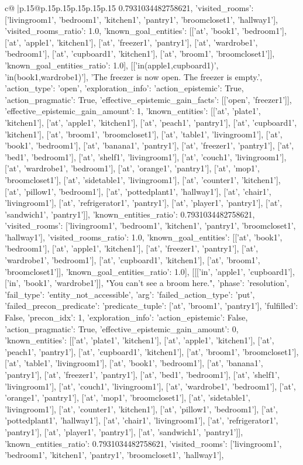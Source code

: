 \documentclass{article}
\begin{document}
{\begin{supertabular}{c@{$\;$}|p{.15\linewidth}@{}p{.15\linewidth}p{.15\linewidth}p{.15\linewidth}p{.15\linewidth}p{.15\linewidth}}
{{{0.7931034482758621, 'visited_rooms': ['livingroom1', 'bedroom1', 'kitchen1', 'pantry1', 'broomcloset1', 'hallway1'], 'visited_rooms_ratio': 1.0, 'known_goal_entities': [['at', 'book1', 'bedroom1'], ['at', 'apple1', 'kitchen1'], ['at', 'freezer1', 'pantry1'], ['at', 'wardrobe1', 'bedroom1'], ['at', 'cupboard1', 'kitchen1'], ['at', 'broom1', 'broomcloset1']], 'known_goal_entities_ratio': 1.0}}], [['in(apple1,cupboard1)', 'in(book1,wardrobe1)'], 'The freezer is now open. The freezer is empty.', {'action_type': 'open', 'exploration_info': {'action_epistemic': True, 'action_pragmatic': True, 'effective_epistemic_gain_facts': [['open', 'freezer1']], 'effective_epistemic_gain_amount': 1, 'known_entities': [['at', 'plate1', 'kitchen1'], ['at', 'apple1', 'kitchen1'], ['at', 'peach1', 'pantry1'], ['at', 'cupboard1', 'kitchen1'], ['at', 'broom1', 'broomcloset1'], ['at', 'table1', 'livingroom1'], ['at', 'book1', 'bedroom1'], ['at', 'banana1', 'pantry1'], ['at', 'freezer1', 'pantry1'], ['at', 'bed1', 'bedroom1'], ['at', 'shelf1', 'livingroom1'], ['at', 'couch1', 'livingroom1'], ['at', 'wardrobe1', 'bedroom1'], ['at', 'orange1', 'pantry1'], ['at', 'mop1', 'broomcloset1'], ['at', 'sidetable1', 'livingroom1'], ['at', 'counter1', 'kitchen1'], ['at', 'pillow1', 'bedroom1'], ['at', 'pottedplant1', 'hallway1'], ['at', 'chair1', 'livingroom1'], ['at', 'refrigerator1', 'pantry1'], ['at', 'player1', 'pantry1'], ['at', 'sandwich1', 'pantry1']], 'known_entities_ratio': 0.7931034482758621, 'visited_rooms': ['livingroom1', 'bedroom1', 'kitchen1', 'pantry1', 'broomcloset1', 'hallway1'], 'visited_rooms_ratio': 1.0, 'known_goal_entities': [['at', 'book1', 'bedroom1'], ['at', 'apple1', 'kitchen1'], ['at', 'freezer1', 'pantry1'], ['at', 'wardrobe1', 'bedroom1'], ['at', 'cupboard1', 'kitchen1'], ['at', 'broom1', 'broomcloset1']], 'known_goal_entities_ratio': 1.0}}], [[['in', 'apple1', 'cupboard1'], ['in', 'book1', 'wardrobe1']], "You can't see a broom here.", {'phase': 'resolution', 'fail_type': 'entity_not_accessible', 'arg': {'failed_action_type': 'put', 'failed_precon_predicate': {'predicate_tuple': ['at', 'broom1', 'pantry1'], 'fulfilled': False, 'precon_idx': 1}}, 'exploration_info': {'action_epistemic': False, 'action_pragmatic': True, 'effective_epistemic_gain_amount': 0, 'known_entities': [['at', 'plate1', 'kitchen1'], ['at', 'apple1', 'kitchen1'], ['at', 'peach1', 'pantry1'], ['at', 'cupboard1', 'kitchen1'], ['at', 'broom1', 'broomcloset1'], ['at', 'table1', 'livingroom1'], ['at', 'book1', 'bedroom1'], ['at', 'banana1', 'pantry1'], ['at', 'freezer1', 'pantry1'], ['at', 'bed1', 'bedroom1'], ['at', 'shelf1', 'livingroom1'], ['at', 'couch1', 'livingroom1'], ['at', 'wardrobe1', 'bedroom1'], ['at', 'orange1', 'pantry1'], ['at', 'mop1', 'broomcloset1'], ['at', 'sidetable1', 'livingroom1'], ['at', 'counter1', 'kitchen1'], ['at', 'pillow1', 'bedroom1'], ['at', 'pottedplant1', 'hallway1'], ['at', 'chair1', 'livingroom1'], ['at', 'refrigerator1', 'pantry1'], ['at', 'player1', 'pantry1'], ['at', 'sandwich1', 'pantry1']], 'known_entities_ratio': 0.7931034482758621, 'visited_rooms': ['livingroom1', 'bedroom1', 'kitchen1', 'pantry1', 'broomcloset1', 'hallway1'], }}}
\end{supertabular}}
\end{document}
